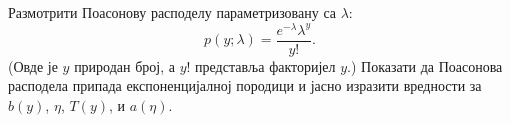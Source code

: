 \item {} Размотрити Поасонову расподелу параметризовану са $\lambda$:
%
\begin{equation*}
  p(y; \lambda) = \frac{e^{-\lambda}\lambda^y}{y!}.
\end{equation*}
%
(Овде је $y$ природан број, а $y!$ представља факторијел $y$.) 
Показати да Поасонова расподела припада експоненцијалној породици и јасно изразити вредности за $b(y)$, $\eta$, $T(y)$, и $a(\eta)$.
